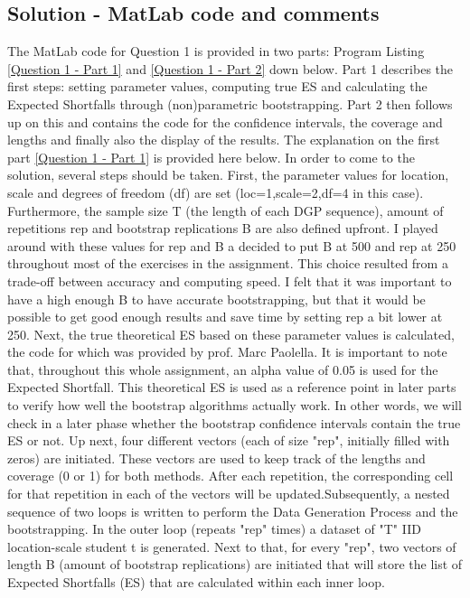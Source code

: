 \documentclass[12pt]{article}
\begin{document}
\subsection*{Solution - MatLab code and comments}
The MatLab code for Question 1 is provided in two parts: Program Listing \ref{Question 1 - Part 1} and \ref{Question 1 - Part 2} down below. Part 1 describes the first steps: setting parameter values, computing true ES and calculating the Expected Shortfalls through (non)parametric bootstrapping. Part 2 then follows up on this and contains the code for the confidence intervals, the coverage and lengths and finally also the display of the results. The explanation on the first part \ref{Question 1 - Part 1} is provided here below.
\newline \newline
In order to come to the solution, several steps should be taken. First, the parameter values for location, scale and degrees of freedom (df) are set (loc=1,scale=2,df=4 in this case). Furthermore, the sample size T (the length of each DGP sequence), amount of repetitions rep and bootstrap replications B are also defined upfront. I played around with these values for rep and B a decided to put B at 500 and rep at 250 throughout most of the exercises in the assignment. This choice resulted from a trade-off between accuracy and computing speed. I felt that it was important to have a high enough B to have accurate bootstrapping, but that it would be possible to get good enough results and save time by setting rep a bit lower at 250. \newline Next, the true theoretical ES based on these parameter values is calculated, the code for which was provided by prof. Marc Paolella. It is important to note that, throughout this whole assignment, an alpha value of 0.05 is used for the Expected Shortfall. This theoretical ES is used as a reference point in later parts to verify how well the bootstrap algorithms actually work. In other words, we will check in a later phase whether the bootstrap confidence intervals contain the true ES or not.\newline
Up next, four different vectors (each of size "rep", initially filled with zeros) are initiated. These vectors are used to keep track of the lengths and coverage (0 or 1) for both methods. After each repetition, the corresponding cell for that repetition in each of the vectors will be updated.\newline\newline Subsequently, a nested sequence of two loops is written to perform the Data Generation Process and the bootstrapping. In the outer loop (repeats "rep" times) a dataset of "T" IID location-scale student t is generated. Next to that, for every "rep", two vectors of length B (amount of bootstrap replications) are initiated that will store the list of Expected Shortfalls (ES) that are calculated within each inner loop.\newline 
\end{document}
